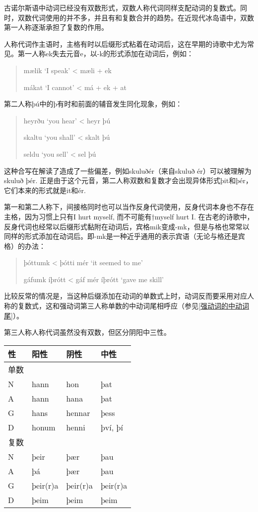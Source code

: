\begin{introduction}[章节要点]
古诺尔斯语中动词已经没有双数形式，双数人称代词同样支配动词的复数式。同时，双数代词使用的并不多，并且有和复数合并的趋势。在近现代冰岛语中，双数第一人称逐渐承担了复数的作用。

人称代词作主语时，主格有时以后缀形式粘着在动词后，这在早期的诗歌中尤为常见。第一人称ek失去元音e，以-k的形式添加在动词后，例如：

\begin{quote}
    mælik `I speak‌' < mæli + ek

    mákat `I cannot‌' < má + ek + at
\end{quote}

第二人称þú中的þ有时和前面的辅音发生同化现象，例如：

\begin{quote}
    heyrðu `you hear' < heyr þú

    skaltu `you shall' < skalt þú

    seldu `you sell' < sel þú
\end{quote}

这种合写在解读了造成了一些偏差，例如skuluðér（来自skuluð ér）可以被理解为skuluð þér.
正是由于这个元音，第二人称双数和复数才会出现异体形式þit和þér，它们本来的形式就是it和ér.

第一和第二人称下，间接格同时也可以当作反身代词使用，反身代词本身也不存在主格，因为习惯上只有I hurt myself, 而不可能有†myself hurt I. 在古老的诗歌中，反身代词也经常以后缀形式黏附在动词后，宾格mik变成-mk，但是与格也常常以同样的形式添加在动词后。即-mk是一种近乎通用的表示宾语（无论与格还是宾格）的办法：

\begin{quote}
    þóttumk < þótti mér `it seemed to me‌'

    gáfumk íþrótt < gáf mér íþrótt `gave me skill'
\end{quote}

比较反常的情况是，当这种后缀添加在动词的单数式上时，动词反而要采用对应人称的复数式，这和强动词第三人称单数的中动词尾相呼应（参见\ref{强动词的中动词尾}）。

第三人称人称代词虽然没有双数，但区分阴阳中三性。

\begin{longtable}{llll}
    \toprule
    性   & 阳性     & 阴性     & 中性     \\
    \midrule
    \endhead
    \bottomrule
    \endfoot
    单数 &          &          &          \\
    N    & hann     & hon      & þat      \\
    A    & hann     & hana     & þat      \\
    G    & hans     & hennar   & þess     \\
    D    & honum    & henni    & því, þí  \\
    复数 &          &          &          \\
    N    & þeir     & þær      & þau      \\
    A    & þá       & þær      & þau      \\
    G    & þeir(r)a & þeir(r)a & þeir(r)a \\
    D    & þeim     & þeim     & þeim     \\
\end{longtable}


\end{introduction}

